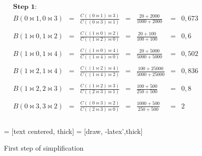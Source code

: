 \documentclass[paper=a4, fontsize=11pt]{scrartcl} %
\numberwithin{equation}{section} %
\numberwithin{figure}{section} %
\numberwithin{table}{section} %
\begin{document}
\begin{align*}
\textbf{Step 1:} \\
B(0 \Join 1, 0 \Join 3) &= &\frac{C((0 \Join 1) \Join 3)}{C((0 \Join 3) \Join 1)}& =& \frac{20+2000}{1000+2000} &=& 0,673& \\ \\
B(1 \Join 0, 1 \Join 2) &= &\frac{C((1 \Join 0) \Join 2)}{C((1 \Join 2) \Join 0)}& =& \frac{20+100}{100+100} &=& 0,6&\\ \\
B(1 \Join 0, 1 \Join 4) &= &\frac{C((1 \Join 0) \Join 4)}{C((1 \Join 4) \Join 0)}& =& \frac{20+5000}{5000+5000} &=& 0,502&\\ \\
B(1 \Join 2, 1 \Join 4) &= &\frac{C((1 \Join 2) \Join 4)}{C((1 \Join 4) \Join 2)}& =& \frac{100+25000}{5000+25000} &=& 0,836&\\ \\
B(1 \Join 2, 2 \Join 3) &= &\frac{C((1 \Join 2) \Join 3)}{C((2 \Join 3) \Join 1)}& =& \frac{100+500}{250+500} &=& 0,8&\\ \\
B(0 \Join 3, 3 \Join 2) &= &\frac{C((0 \Join 3) \Join 2)}{C((2 \Join 3) \Join 0)}& =& \frac{1000+500}{250+500} &=& 2 &\\ \\
\end{align*}

\begin{figure}[H]
	\centering
		 = [text centered, thick]
		 = [draw, -latex',thick]  

	\caption{First step of simplification}
	  \label{simpl1}
\end{figure}
\end{document}
